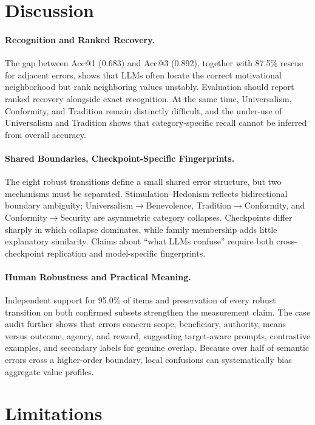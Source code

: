 \documentclass[runningheads,a4paper]{llncs}
\begin{document}
\section{Discussion}

\paragraph{Recognition and Ranked Recovery.}
The gap between Acc@1 (0.683) and Acc@3 (0.892), together with 87.5\% rescue for adjacent errors, shows that LLMs often locate the correct motivational neighborhood but rank neighboring values unstably. Evaluation should report ranked recovery alongside exact recognition. At the same time, Universalism, Conformity, and Tradition remain distinctly difficult, and the under-use of Universalism and Tradition shows that category-specific recall cannot be inferred from overall accuracy.

\paragraph{Shared Boundaries, Checkpoint-Specific Fingerprints.}
The eight robust transitions define a small shared error structure, but two mechanisms must be separated. Stimulation--Hedonism reflects bidirectional boundary ambiguity; Universalism$\rightarrow$Benevolence, Tradition$\rightarrow$Conformity, and Conformity$\rightarrow$Security are asymmetric category collapses. Checkpoints differ sharply in which collapse dominates, while family membership adds little explanatory similarity. Claims about ``what LLMs confuse'' require both cross-checkpoint replication and model-specific fingerprints.

\paragraph{Human Robustness and Practical Meaning.}
Independent support for 95.0\% of items and preservation of every robust transition on both confirmed subsets strengthen the measurement claim. The case audit further shows that errors concern scope, beneficiary, authority, means versus outcome, agency, and reward, suggesting target-aware prompts, contrastive examples, and secondary labels for genuine overlap. Because over half of semantic errors cross a higher-order boundary, local confusions can systematically bias aggregate value profiles.

\section{Limitations}
\end{document}

